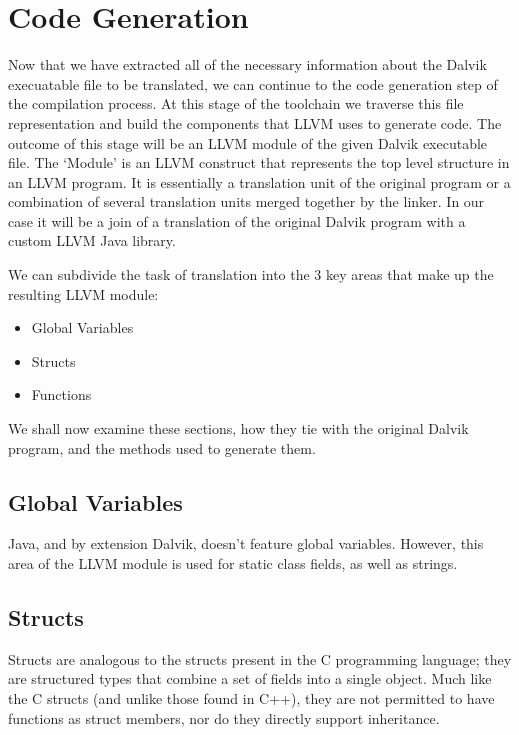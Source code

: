 \section{Code Generation}

Now that we have extracted all of the necessary information about the Dalvik execuatable file to be translated, we can continue to the code generation step of the compilation process. At this stage of the toolchain we traverse this file representation and build the components that LLVM uses to generate code. The outcome of this stage will be an LLVM module of the given Dalvik executable file. The `Module' is an LLVM construct that represents the top level structure in an LLVM program. It is essentially a translation unit of the original program or a combination of several translation units merged together by the linker. In our case it will be a join of a translation of the original Dalvik program with a custom LLVM Java library.

We can subdivide the task of translation into the 3 key areas that make up the resulting LLVM module:

\begin{itemize}
	\item Global Variables
	\item Structs
	\item Functions
\end{itemize}

We shall now examine these sections, how they tie with the original Dalvik program, and the methods used to generate them.

\subsection*{Global Variables}

Java, and by extension Dalvik, doesn't feature global variables. However, this area of the LLVM module is used for static class fields, as well as strings.

\subsection*{Structs}

Structs are analogous to the structs present in the C programming language; they are structured types that combine a set of fields into a single object. Much like the C structs (and unlike those found in C++), they are not permitted to have functions as struct members, nor do they directly support inheritance.

